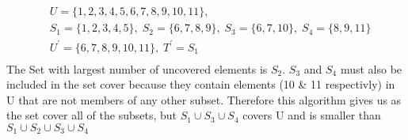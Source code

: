 \begin{minipage}{.80\textwidth}{\color{answer}{}
\begin{align*}
	&U = \{1,2,3,4,5,6,7,8,9,10,11\}, \\
	&S_{1} = \{1,2,3,4,5\}, \; S_{2} = \{6,7,8,9\}, \; S_{3} = \{6,7,10\}, \; S_{4} = \{8,9,11\} \\
	&U^{'} = \{6,7,8,9,10,11\}, \; T^{'} = S_{1} \\
\end{align*}
The Set with largest number of uncovered elements is $S_{2}$. $S_{3}$ and $S_{4}$ must also be included in the set cover because they contain elements (10 \& 11 respectivly)
in U that are not members of any other subset. Therefore this algorithm gives us as the set cover all of the subsets, but $S_{1} \cup S_{3} \cup S_{4}$ covers U and is smaller
than $S_{1} \cup S_{2} \cup S_{3} \cup S_{4}$
}\end{minipage}



